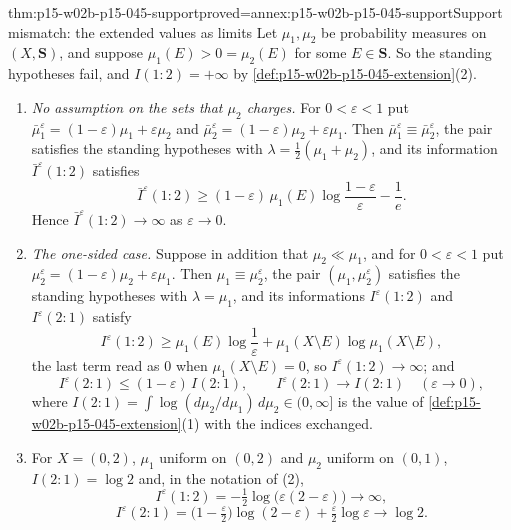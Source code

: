 \begin{hbtheorem}{thm:p15-w02b-p15-045-support}{proved=annex:p15-w02b-p15-045-support}{Support mismatch: the extended values as limits}
Let \(\mu_1,\mu_2\) be probability measures on \((X,\mathbf S)\), and
suppose \(\mu_1(E)>0=\mu_2(E)\) for some \(E\in\mathbf S\). So the
standing hypotheses fail, and \(I(1:2)=+\infty\) by
\cref{def:p15-w02b-p15-045-extension}(2).
\begin{enumerate}
\item \emph{No assumption on the sets that \(\mu_2\) charges.} For
\(0<\varepsilon<1\) put
\(\bar\mu_1^\varepsilon=(1-\varepsilon)\mu_1+\varepsilon\mu_2\) and
\(\bar\mu_2^\varepsilon=(1-\varepsilon)\mu_2+\varepsilon\mu_1\). Then
\(\bar\mu_1^\varepsilon\equiv\bar\mu_2^\varepsilon\), the pair satisfies
the standing hypotheses with \(\lambda=\tfrac12(\mu_1+\mu_2)\), and its
information \(\bar I^\varepsilon(1:2)\) satisfies
\[
  \bar I^\varepsilon(1:2)\geq(1-\varepsilon)\,\mu_1(E)\log\frac{1-\varepsilon}\varepsilon-\frac1e .
\]
Hence \(\bar I^\varepsilon(1:2)\to\infty\) as \(\varepsilon\to0\).
\item \emph{The one-sided case.} Suppose in addition that
\(\mu_2\ll\mu_1\), and for \(0<\varepsilon<1\) put
\(\mu_2^\varepsilon=(1-\varepsilon)\mu_2+\varepsilon\mu_1\). Then
\(\mu_1\equiv\mu_2^\varepsilon\), the pair
\((\mu_1,\mu_2^\varepsilon)\) satisfies the standing hypotheses with
\(\lambda=\mu_1\), and its informations \(I^\varepsilon(1:2)\) and
\(I^\varepsilon(2:1)\) satisfy
\[
  I^\varepsilon(1:2)\geq\mu_1(E)\log\frac1\varepsilon+\mu_1(X\setminus E)\log\mu_1(X\setminus E),
\]
the last term read as \(0\) when \(\mu_1(X\setminus E)=0\), so
\(I^\varepsilon(1:2)\to\infty\); and
\[
  I^\varepsilon(2:1)\leq(1-\varepsilon)\,I(2:1),\qquad
  I^\varepsilon(2:1)\to I(2:1)\quad(\varepsilon\to0),
\]
where \(I(2:1)=\int\log(d\mu_2/d\mu_1)\,d\mu_2\in(0,\infty]\) is the
value of \cref{def:p15-w02b-p15-045-extension}(1) with the indices
exchanged.
\item For \(X=(0,2)\), \(\mu_1\) uniform on \((0,2)\) and \(\mu_2\)
uniform on \((0,1)\), \(I(2:1)=\log2\) and, in the notation of (2),
\[
  I^\varepsilon(1:2)=-\tfrac12\log\bigl(\varepsilon(2-\varepsilon)\bigr)\to\infty,
\]
\[
  I^\varepsilon(2:1)=\bigl(1-\tfrac\varepsilon2\bigr)\log(2-\varepsilon)
     +\tfrac\varepsilon2\log\varepsilon\to\log2 .
\]
\end{enumerate}
\end{hbtheorem}

